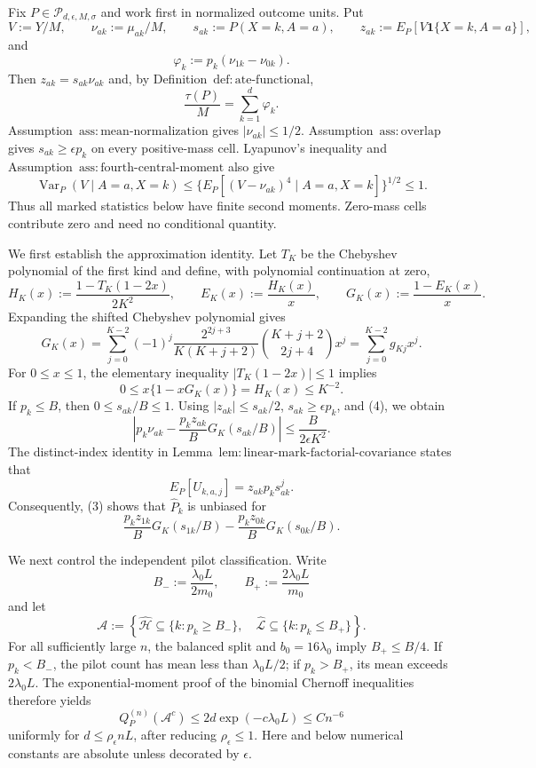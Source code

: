 Fix \(P\in\mathcal P_{d,\epsilon,M,\sigma}\) and work first in normalized outcome units.  Put
\[
 V:=Y/M,\qquad \nu_{ak}:=\mu_{ak}/M,\qquad
 s_{ak}:=P(X=k,A=a),\qquad z_{ak}:=E_P[V\mathbf 1\{X=k,A=a\}],
\]
and
\[
 \varphi_k:=p_k(\nu_{1k}-\nu_{0k}).
\]
Then \(z_{ak}=s_{ak}\nu_{ak}\) and, by Definition~\(\mathrm{def:ate\text{-}functional}\),
\[
 \frac{\tau(P)}M=\sum_{k=1}^d\varphi_k.
\tag{1}
\]
Assumption~\(\mathrm{ass:mean\text{-}normalization}\) gives \(|\nu_{ak}|\le1/2\).  Assumption~\(\mathrm{ass:overlap}\) gives \(s_{ak}\ge\epsilon p_k\) on every positive-mass cell.  Lyapunov's inequality and Assumption~\(\mathrm{ass:fourth\text{-}central\text{-}moment}\) also give
\[
 \operatorname{Var}_P(V\mid A=a,X=k)
 \le \{E_P[(V-\nu_{ak})^4\mid A=a,X=k]\}^{1/2}\le1.
\tag{2}
\]
Thus all marked statistics below have finite second moments.  Zero-mass cells contribute zero and need no conditional quantity.

We first establish the approximation identity.  Let \(T_K\) be the Chebyshev polynomial of the first kind and define, with polynomial continuation at zero,
\[
 H_K(x):=\frac{1-T_K(1-2x)}{2K^2},\qquad
 E_K(x):=\frac{H_K(x)}x,\qquad
 G_K(x):=\frac{1-E_K(x)}x.
\]
Expanding the shifted Chebyshev polynomial gives
\[
 G_K(x)=\sum_{j=0}^{K-2}(-1)^j
 \frac{2^{2j+3}}{K(K+j+2)}\binom{K+j+2}{2j+4}x^j
 =\sum_{j=0}^{K-2}g_{Kj}x^j.
\tag{3}
\]
For \(0\le x\le1\), the elementary inequality \(|T_K(1-2x)|\le1\) implies
\[
 0\le x\{1-xG_K(x)\}=H_K(x)\le K^{-2}.
\tag{4}
\]
If \(p_k\le B\), then \(0\le s_{ak}/B\le1\).  Using \(|z_{ak}|\le s_{ak}/2\), \(s_{ak}\ge\epsilon p_k\), and (4), we obtain
\[
 \left|p_k\nu_{ak}-\frac{p_kz_{ak}}B
 G_K(s_{ak}/B)\right|
 \le \frac{B}{2\epsilon K^2}.
\tag{5}
\]
The distinct-index identity in Lemma~\(\mathrm{lem:linear\text{-}mark\text{-}factorial\text{-}covariance}\) states that
\[
 E_P[U_{k,a,j}]=z_{ak}p_ks_{ak}^{j}.
\]
Consequently, (3) shows that \(\widehat P_k\) is unbiased for
\[
 \frac{p_kz_{1k}}B G_K(s_{1k}/B)
 -\frac{p_kz_{0k}}B G_K(s_{0k}/B).
\tag{6}
\]

We next control the independent pilot classification.  Write
\[
 B_-:=\frac{\lambda_0L}{2m_0},\qquad
 B_+:=\frac{2\lambda_0L}{m_0}
\]
and let
\[
 \mathcal A:=
 \left\{\widehat{\mathcal H}\subseteq\{k:p_k\ge B_-\},\quad
 \widehat{\mathcal L}\subseteq\{k:p_k\le B_+\}\right\}.
\]
For all sufficiently large \(n\), the balanced split and \(b_0=16\lambda_0\) imply \(B_+\le B/4\).  If \(p_k<B_-\), the pilot count has mean less than \(\lambda_0L/2\); if \(p_k>B_+\), its mean exceeds \(2\lambda_0L\).  The exponential-moment proof of the binomial Chernoff inequalities therefore yields
\[
 Q_P^{(n)}(\mathcal A^c)
 \le 2d\exp(-c\lambda_0L)\le Cn^{-6}
\tag{7}
\]
uniformly for \(d\le\rho_\epsilon nL\), after reducing \(\rho_\epsilon\le1\).  Here and below numerical constants are absolute unless decorated by \(\epsilon\).


